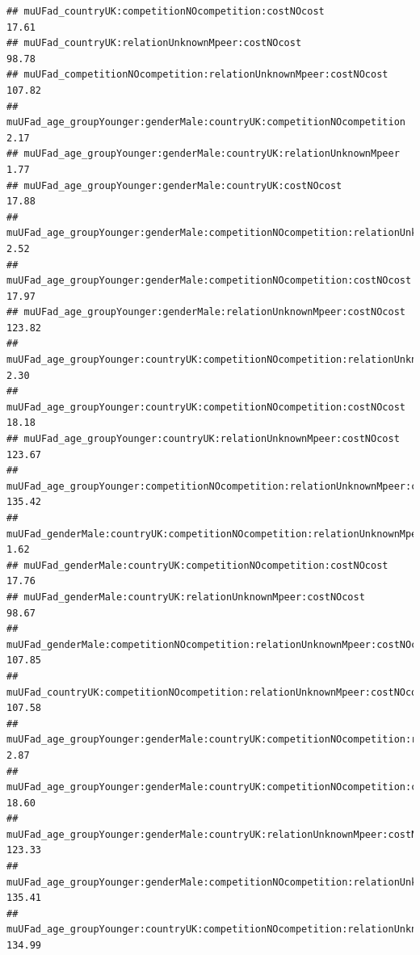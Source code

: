 \documentclass[
]{article}
\begin{document}
\begin{verbatim}
## muUFad_countryUK:competitionNOcompetition:costNOcost                                                       17.61
## muUFad_countryUK:relationUnknownMpeer:costNOcost                                                           98.78
## muUFad_competitionNOcompetition:relationUnknownMpeer:costNOcost                                           107.82
## muUFad_age_groupYounger:genderMale:countryUK:competitionNOcompetition                                       2.17
## muUFad_age_groupYounger:genderMale:countryUK:relationUnknownMpeer                                           1.77
## muUFad_age_groupYounger:genderMale:countryUK:costNOcost                                                    17.88
## muUFad_age_groupYounger:genderMale:competitionNOcompetition:relationUnknownMpeer                            2.52
## muUFad_age_groupYounger:genderMale:competitionNOcompetition:costNOcost                                     17.97
## muUFad_age_groupYounger:genderMale:relationUnknownMpeer:costNOcost                                        123.82
## muUFad_age_groupYounger:countryUK:competitionNOcompetition:relationUnknownMpeer                             2.30
## muUFad_age_groupYounger:countryUK:competitionNOcompetition:costNOcost                                      18.18
## muUFad_age_groupYounger:countryUK:relationUnknownMpeer:costNOcost                                         123.67
## muUFad_age_groupYounger:competitionNOcompetition:relationUnknownMpeer:costNOcost                          135.42
## muUFad_genderMale:countryUK:competitionNOcompetition:relationUnknownMpeer                                   1.62
## muUFad_genderMale:countryUK:competitionNOcompetition:costNOcost                                            17.76
## muUFad_genderMale:countryUK:relationUnknownMpeer:costNOcost                                                98.67
## muUFad_genderMale:competitionNOcompetition:relationUnknownMpeer:costNOcost                                107.85
## muUFad_countryUK:competitionNOcompetition:relationUnknownMpeer:costNOcost                                 107.58
## muUFad_age_groupYounger:genderMale:countryUK:competitionNOcompetition:relationUnknownMpeer                  2.87
## muUFad_age_groupYounger:genderMale:countryUK:competitionNOcompetition:costNOcost                           18.60
## muUFad_age_groupYounger:genderMale:countryUK:relationUnknownMpeer:costNOcost                              123.33
## muUFad_age_groupYounger:genderMale:competitionNOcompetition:relationUnknownMpeer:costNOcost               135.41
## muUFad_age_groupYounger:countryUK:competitionNOcompetition:relationUnknownMpeer:costNOcost                134.99

\end{verbatim}
\end{document}
